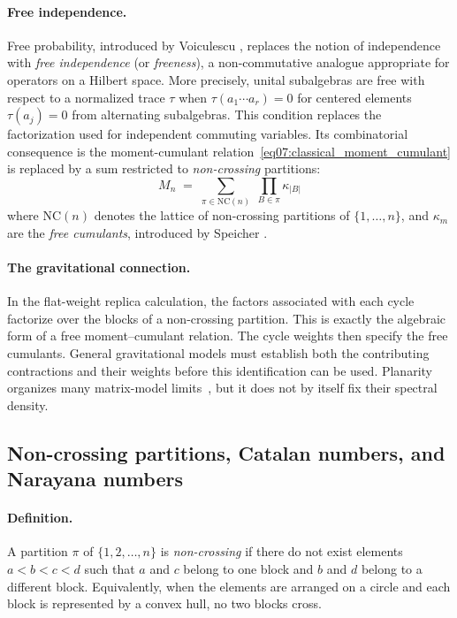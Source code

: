 \documentclass[11pt,letterpaper]{article}
\theoremstyle{plain}
\theoremstyle{definition}
\theoremstyle{remark}
\begin{document}
\paragraph{Free independence.}
Free probability, introduced by Voiculescu \cite{voiculescu1991}, replaces
the notion of independence with \emph{free independence} (or
\emph{freeness}), a non-commutative analogue appropriate for operators on
a Hilbert space.  More precisely, unital subalgebras are free with respect to a normalized
trace $\tau$ when $\tau(a_1\cdots a_r)=0$ for centered elements
$\tau(a_j)=0$ from alternating subalgebras.  This condition replaces the
factorization used for independent commuting variables.  Its combinatorial
consequence is
the moment-cumulant relation~\eqref{eq07:classical_moment_cumulant} is
replaced by a sum restricted to \emph{non-crossing} partitions:
\begin{equation}
  \boxed{
  M_n \;=\; \sum_{\pi \in \mathrm{NC}(n)} \;\prod_{B \in \pi} \kappa_{|B|}
  }
  \label{eq07:free_moment_cumulant}
\end{equation}
where $\mathrm{NC}(n)$ denotes the lattice of non-crossing partitions of
$\{1,\ldots,n\}$, and $\kappa_m$ are the \emph{free cumulants},
introduced by Speicher \cite{speicher1994}.

\paragraph{The gravitational connection.}
In the flat-weight replica calculation, the factors associated with each cycle
factorize over the blocks of a non-crossing partition.  This is exactly the
algebraic form of a free moment--cumulant relation.  The cycle weights then
specify the free cumulants.  General gravitational models must establish both
the contributing contractions and their weights before this identification can
be used.  Planarity organizes many matrix-model limits~\cite{thooft1974},
but it does not by itself fix their spectral density.

\subsection{Non-crossing partitions, Catalan numbers, and Narayana numbers}
\label{subsec07:noncrossing}

\paragraph{Definition.}
A partition $\pi$ of $\{1,2,\ldots,n\}$ is \emph{non-crossing} if there
do not exist elements $a < b < c < d$ such that $a$ and $c$ belong to one
block and $b$ and $d$ belong to a different block.  Equivalently, when the
elements are arranged on a circle and each block is represented by a
convex hull, no two blocks cross.
\end{document}
